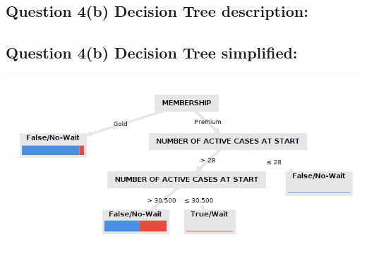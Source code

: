 \documentclass[12pt]{article}
\begin{document}
\subsection*{Question 4(b) Decision Tree description:}

\subsection*{Question 4(b) Decision Tree simplified:}
\includegraphics[width=0.75\columnwidth]{Question_4/img/RapidMiner_b_Decision_Tree_simplified.png}
\end{document}
